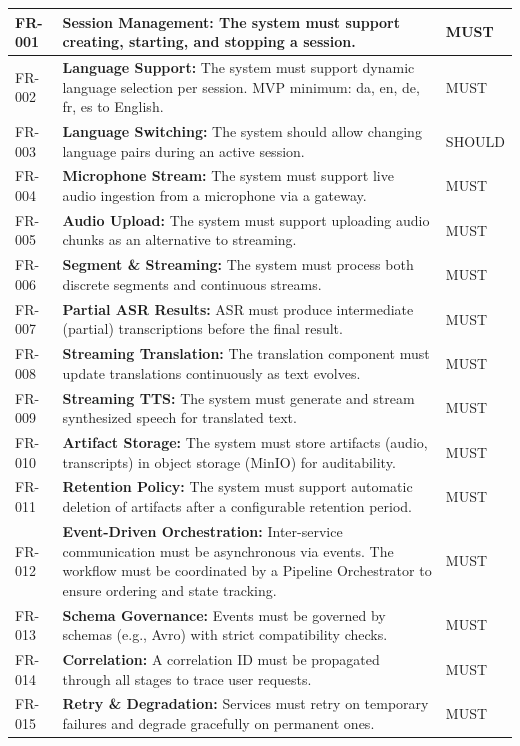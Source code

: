 \begin{longtable}{|l|p{10cm}|l|}
FR-001 & \textbf{Session Management:} The system must support creating, starting, and stopping a session. & MUST \\ \hline
FR-002 & \textbf{Language Support:} The system must support dynamic language selection per session. MVP minimum: {da, en, de, fr, es} to English. & MUST \\ \hline
FR-003 & \textbf{Language Switching:} The system should allow changing language pairs during an active session. & SHOULD \\ \hline
FR-004 & \textbf{Microphone Stream:} The system must support live audio ingestion from a microphone via a gateway. & MUST \\ \hline
FR-005 & \textbf{Audio Upload:} The system must support uploading audio chunks as an alternative to streaming. & MUST \\ \hline
FR-006 & \textbf{Segment \& Streaming:} The system must process both discrete segments and continuous streams. & MUST \\ \hline
FR-007 & \textbf{Partial ASR Results:} ASR must produce intermediate (partial) transcriptions before the final result. & MUST \\ \hline
FR-008 & \textbf{Streaming Translation:} The translation component must update translations continuously as text evolves. & MUST \\ \hline
FR-009 & \textbf{Streaming TTS:} The system must generate and stream synthesized speech for translated text. & MUST \\ \hline
FR-010 & \textbf{Artifact Storage:} The system must store artifacts (audio, transcripts) in object storage (MinIO) for auditability. & MUST \\ \hline
FR-011 & \textbf{Retention Policy:} The system must support automatic deletion of artifacts after a configurable retention period. & MUST \\ \hline
FR-012 & \textbf{Event-Driven Orchestration:} Inter-service communication must be asynchronous via events. The workflow must be coordinated by a Pipeline Orchestrator to ensure ordering and state tracking. & MUST \\ \hline
FR-013 & \textbf{Schema Governance:} Events must be governed by schemas (e.g., Avro) with strict compatibility checks. & MUST \\ \hline
FR-014 & \textbf{Correlation:} A correlation ID must be propagated through all stages to trace user requests. & MUST \\ \hline
FR-015 & \textbf{Retry \& Degradation:} Services must retry on temporary failures and degrade gracefully on permanent ones. & MUST \\ \hline

\end{longtable}

